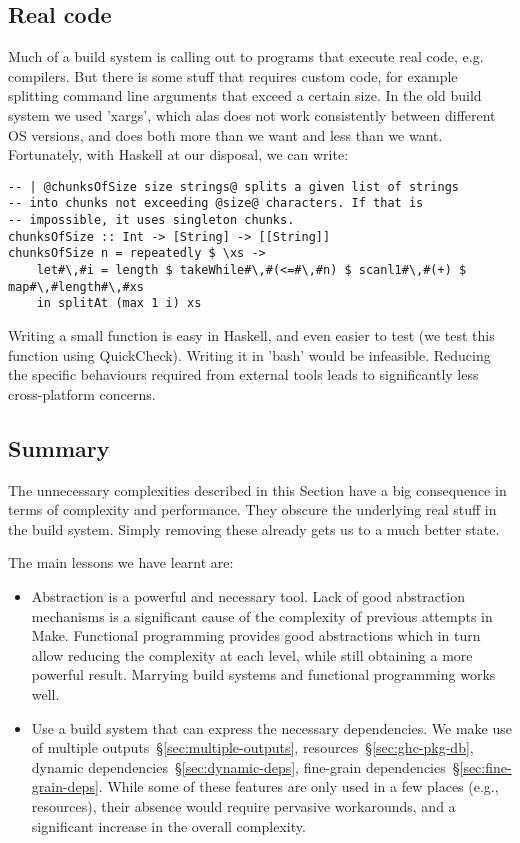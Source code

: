 \subsection{Real code}

Much of a build system is calling out to programs that execute real code, e.g.
compilers. But there is some stuff that requires custom code, for example
splitting command line arguments that exceed a certain size. In the old
build system we used \lst'xargs', which alas does not work consistently between
different OS versions, and does both more than we want and less than we want.
Fortunately, with Haskell at our disposal, we can write:

\begin{lstlisting}
-- | @chunksOfSize size strings@ splits a given list of strings
-- into chunks not exceeding @size@ characters. If that is
-- impossible, it uses singleton chunks.
chunksOfSize :: Int -> [String] -> [[String]]
chunksOfSize n = repeatedly $ \xs ->
    let#\,#i = length $ takeWhile#\,#(<=#\,#n) $ scanl1#\,#(+) $ map#\,#length#\,#xs
    in splitAt (max 1 i) xs
\end{lstlisting}

\noindent Writing a small function is easy in Haskell, and even easier to test
(we test this function using QuickCheck). Writing it in \lst'bash' would be infeasible.
Reducing the specific behaviours required from external tools leads to
significantly less cross-platform concerns.

\subsection{Summary}

The unnecessary complexities described in this Section have a big consequence in
terms of complexity and performance. They obscure the underlying real stuff in
the build system. Simply removing these already gets us to a much better state.

The main lessons we have learnt are:

\begin{itemize}
\item Abstraction is a powerful and necessary tool. Lack of good abstraction
mechanisms is a significant cause of the complexity of previous attempts in
Make. Functional programming provides good abstractions which in turn allow
reducing the complexity at each level, while still obtaining a more powerful
result. Marrying build systems and functional programming works well.
\item Use a build system that can express the necessary dependencies. We make
use of multiple outputs~\S\ref{sec:multiple-outputs},
resources~\S\ref{sec:ghc-pkg-db}, dynamic dependencies~\S\ref{sec:dynamic-deps},
fine-grain dependencies~\S\ref{sec:fine-grain-deps}. While some of these
features are only used in a few places (e.g., resources), their absence would
require pervasive workarounds, and a significant increase in the overall complexity.
\end{itemize}

